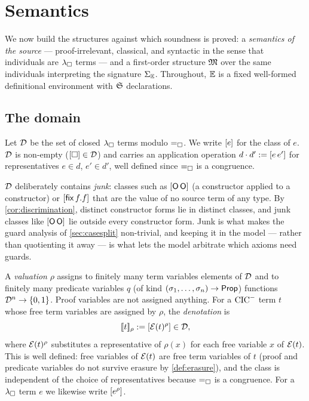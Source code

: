 \section{Semantics}
\label{sec:semantics}

We now build the structures against which soundness is proved: a
\emph{semantics of the source} --- proof-irrelevant, classical, and
syntactic in the sense that individuals are $\lambda_{\square}$ terms --- and a
first-order structure $\mathfrak{M}$ over the same individuals interpreting the
signature $\Sigma_{\mathbb{E}}$.  Throughout, $\mathbb{E}$ is a fixed well-formed
definitional environment with $\mathfrak{S}$ declarations.

\subsection{The domain}
\label{sec:semantics-domain}

\begin{definition}[Domain]
\label{def:domain}
Let $\mathcal{D}$ be the set of closed $\lambda_{\square}$ terms modulo $=_{\square}$.  We write
$[e]$ for the class of $e$.  $\mathcal{D}$ is non-empty ($[\square] \in
\mathcal{D}$) and carries an application operation $d \cdot d' \mathrel{:=}
[e\,e']$ for representatives $e \in d$, $e' \in d'$, well defined
since $=_{\square}$ is a congruence.
\end{definition}

$\mathcal{D}$ deliberately contains \emph{junk}: classes such as
$[\mathsf{O}\,\mathsf{O}]$ (a constructor applied to a constructor) or
$[\mathsf{fix}\,f.f]$ that are the value of no source term of any
type.  By \cref{cor:discrimination}, distinct constructor forms lie in
distinct classes, and junk classes like $[\mathsf{O}\,\mathsf{O}]$ lie outside
every constructor form.  Junk is what makes the guard analysis of
\cref{sec:casesplit} non-trivial, and keeping it in the model --- rather
than quotienting it away --- is what lets the model arbitrate which
axioms need guards.

\begin{definition}
\label{def:valuation}
A \emph{valuation} $\rho$ assigns to finitely many term variables elements
of $\mathcal{D}$ and to finitely many predicate variables $q$ (of kind
$(\sigma_1, \dots, \sigma_n) \to \mathsf{Prop}$) functions $\mathcal{D}^n \to \{0,1\}$.
Proof variables are not assigned anything.  For a $\mathrm{CIC}^{-}$ term $t$ whose
free term variables are assigned by $\rho$, the \emph{denotation} is
\[
  [\![ t ]\!]_\rho \mathrel{:=} [\mathcal{E}(t)^\rho] \in \mathcal{D},
\]
where $\mathcal{E}(t)^\rho$ substitutes a representative of $\rho(x)$ for each
free variable $x$ of $\mathcal{E}(t)$.  This is well defined: free variables
of $\mathcal{E}(t)$ are free term variables of $t$ (proof and predicate
variables do not survive erasure by \cref{def:erasure}), and the class is
independent of the choice of representatives because $=_{\square}$ is a
congruence.  For a $\lambda_{\square}$ term $e$ we likewise write $[e^\rho]$.
\end{definition}


